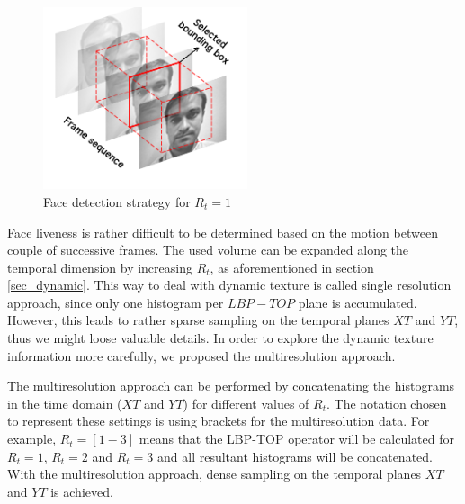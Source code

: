 \begin{figure}[!htb]
\begin{center}
\includegraphics [width=6cm] {images/proposed_countermeasure/faceDetection_2.png}
\caption[Face detection strategy for $R_t = 1$]{Face detection strategy for $R_t = 1$} \label{fig_faceDetection}
\end{center}
\end{figure}

Face liveness is rather difficult to be determined based on the motion between couple of successive frames. The used volume can be expanded along the temporal dimension by increasing $R_t$, as aforementioned in section \ref{sec_dynamic}. This way to deal with dynamic texture is called single resolution approach, since only one histogram per $LBP-TOP$ plane is accumulated. However, this leads to rather sparse sampling on the temporal planes $XT$ and $YT$, thus we might loose valuable details. In order to explore the dynamic texture information more carefully, we proposed the multiresolution approach.

The multiresolution approach can be performed by concatenating the histograms in the time domain ($XT$ and $YT$) for different values of $R_t$. The notation chosen to represent these settings is using brackets for the multiresolution data. For example, $R_t=[1-3]$ means that the LBP-TOP operator will be calculated for $R_t=1$, $R_t=2$ and $R_t=3$ and all resultant histograms will be concatenated. With the multiresolution approach, dense sampling on the temporal planes $XT$ and $YT$ is achieved.


